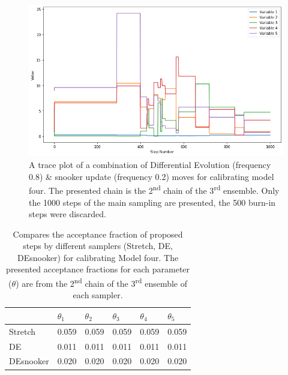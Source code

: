 \begin{figure}[hb]
\centering
\includegraphics[width=\textwidth]{Figures/appendix_figs/C.1.1 trace plot DEsnooker.png}
\caption{A trace plot of a combination
of Differential Evolution (frequency 0.8) \& snooker update (frequency 0.2) moves for calibrating model four. The presented chain is the 2\textsuperscript{nd}
chain of the 3\textsuperscript{rd} ensemble. Only the 1000 steps of the main sampling are presented, the 500 burn-in steps were discarded.}\label{fig_logbook_1.1_trace_plot_DEsnooker}
\end{figure}

\clearpage %

\begin{table}[ht]
\centering
\caption{Compares the acceptance fraction of proposed steps by different samplers (Stretch, DE, DEsnooker)  for calibrating Model four. The presented acceptance fractions for each parameter ($\theta$) are from the 2\textsuperscript{nd} chain of the 3\textsuperscript{rd} ensemble of each sampler.}
\label{tab_logbook_1.1_acceptance_frac}
\begin{tabularx}{\textwidth}{XXXXXX}
\toprule
 & \(\theta_1\) & \(\theta_2\) & \(\theta_3\) & \(\theta_4\) & \(\theta_5\) \\
\midrule
Stretch & 0.059 & 0.059 & 0.059 & 0.059 & 0.059 \\
DE & 0.011 & 0.011 & 0.011 & 0.011 & 0.011 \\
DEsnooker & 0.020 & 0.020 & 0.020 & 0.020 & 0.020 \\
\bottomrule
\end{tabularx}
\centering
\end{table}


